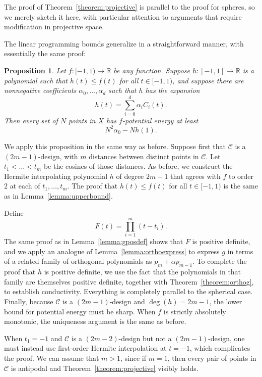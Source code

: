 \documentclass{jams-l}
\theoremstyle{plain}
\newtheorem{proposition}[theorem]{Proposition}
\numberwithin{theorem}{section}
\theoremstyle{definition}
\numberwithin{equation}{section}
\newcommand{\R}{{\mathbb R}}
\newcommand{\CodeS}{\mathcal{C}}
\newcommand{\co}{\colon}
\begin{document}
The proof of Theorem~\ref{theorem:projective} is parallel to the
proof for spheres, so we merely sketch it here, with particular
attention to arguments that require modification in projective
space.

The linear programming bounds generalize in a straightforward manner, with
essentially the same proof:

\begin{proposition} \label{prop:projlpbound}
Let $f \co [-1,1) \to \R$ be any function.  Suppose $h \co [-1,1]
\to \R$ is a polynomial such that $h(t) \le f(t)$ for all $t \in
[-1,1)$, and suppose there are nonnegative coefficients
$\alpha_0,\dots,\alpha_d$ such that $h$ has the expansion
$$
h(t) = \sum_{i=0}^d \alpha_i C_i(t).
$$
Then every set of $N$ points in $X$ has $f$-potential energy at
least
$$
N^2\alpha_0 - Nh(1).
$$
\end{proposition}

We apply this proposition in the same way as before. Suppose first
that $\CodeS$ is a $(2m-1)$-design, with $m$ distances between
distinct points in $\CodeS$.  Let $t_1 < \dots < t_m$ be the
cosines of those distances.  As before, we construct the Hermite
interpolating polynomial $h$ of degree $2m-1$ that agrees with $f$
to order $2$ at each of $t_1,\dots,t_m$.  The proof that $h(t) \le
f(t)$ for all $t \in [-1,1)$ is the same as in
Lemma~\ref{lemma:upperbound}.

Define
$$
F(t) = \prod_{i=1}^m (t-t_i).
$$
The same proof as in Lemma~\ref{lemma:gposdef} shows that $F$ is
positive definite, and we apply an analogue of
Lemma~\ref{lemma:orthoexpress} to express $g$ in terms of a
related family of orthogonal polynomials as $p_m+\alpha p_{m-1}$.
To complete the proof that $h$ is positive definite, we use the
fact that the polynomials in that family are themselves positive
definite, together with Theorem~\ref{theorem:orthog}, to establish
conductivity. Everything is completely parallel to the spherical
case. Finally, because $\CodeS$ is a $(2m-1)$-design and
$\deg(h)=2m-1$, the lower bound for potential energy must be
sharp.  When $f$ is strictly absolutely monotonic, the uniqueness
argument is the same as before.

When $t_1=-1$ and $\CodeS$ is a $(2m-2)$-design but not a
$(2m-1)$-design, one must instead use first-order Hermite
interpolation at $t=-1$, which complicates the proof. We can
assume that $m>1$, since if $m=1$, then every pair of points in
$\CodeS$ is antipodal and Theorem~\ref{theorem:projective} visibly
holds.
\end{document}
